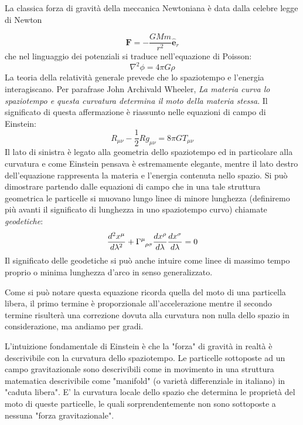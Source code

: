 \documentclass[twoside]{article}
\begin{document}
La classica forza di gravità della meccanica Newtoniana è data dalla celebre legge di Newton

\begin{equation}
	\mathbf{F} = - \dfrac{G M m }{r^2} \hat{\mathbf{e}}_r
\end{equation}
che nel linguaggio dei potenziali si traduce nell'equazione di Poisson:
\begin{equation}
	\nabla^2 \phi = 4 \pi G \rho
\end{equation}
La teoria della relatività generale prevede che lo spaziotempo e l'energia interagiscano. Per parafrase John Archivald Wheeler, \emph{La materia curva lo spaziotempo e questa curvatura determina il moto della materia
stessa}. Il significato di questa affermazione è riassunto nelle equazioni di campo di Einstein:
\begin{equation}
	R_{\mu \nu} - \dfrac{1}{2}R g_{\mu \nu} = 8\pi G T_{\mu \nu}
\end{equation}
Il lato di sinistra è legato alla geometria dello spaziotempo ed in particolare alla curvatura e come Einstein pensava è estremamente elegante, mentre il lato destro dell'equazione rappresenta la materia e l'energia contenuta nello spazio. Si può dimostrare partendo dalle equazioni di campo che  in una tale struttura geometrica le particelle si muovano lungo linee di minore lunghezza (definiremo più avanti il significato di lunghezza in uno spaziotempo curvo) chiamate \emph{geodetiche}:
\begin{equation}
	\dfrac{d^2 x^\mu}{d \lambda^2} + \Gamma\indices{^\mu_\rho_\sigma} \dfrac{d x^\rho}{d\lambda} \dfrac{d x^\sigma}{d \lambda} = 0
\end{equation}
Il significato delle geodetiche si può anche intuire come linee di massimo tempo proprio o minima lunghezza d'arco in senso generalizzato.

Come si può notare questa equazione ricorda quella del moto di una particella libera, il primo termine è proporzionale all'accelerazione mentre il secondo termine risulterà una correzione dovuta alla curvatura non nulla dello spazio in considerazione, ma andiamo per gradi.

L'intuizione fondamentale di Einstein è che la "forza" di gravità in realtà è descrivibile con la curvatura dello spaziotempo. Le particelle sottoposte ad un campo gravitazionale sono descrivibili come in movimento in una struttura matematica descrivibile come "manifold" (o varietà differenziale in italiano) in "caduta libera". E' la curvatura locale dello spazio che determina le proprietà del moto di queste particelle, le quali sorprendentemente non sono sottoposte a nessuna "forza gravitazionale".
\end{document}
